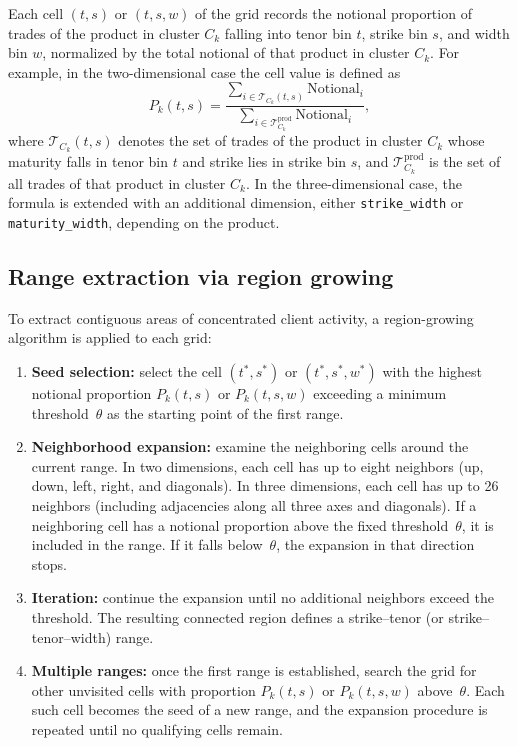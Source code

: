 \documentclass[12pt,a4paper]{report}
\begin{document}
Each cell \((t, s)\) or \((t, s, w)\) of the grid records the notional proportion of trades of the 
product in cluster \(C_k\) falling into tenor bin \(t\), strike bin \(s\), and width bin \(w\), 
normalized by the total notional of that product in cluster \(C_k\). For example, in the 
two-dimensional case the cell value is defined as
\[
    P_{k}(t,s) = 
    \frac{\sum_{i \in \mathcal{T}_{C_k}(t,s)} \text{Notional}_{i}}
         {\sum_{i \in \mathcal{T}_{C_k}^{\text{prod}}} \text{Notional}_{i}},
\]
where \(\mathcal{T}_{C_k}(t,s)\) denotes the set of trades of the product in cluster \(C_k\) whose 
maturity falls in tenor bin \(t\) and strike lies in strike bin \(s\), and 
\(\mathcal{T}_{C_k}^{\text{prod}}\) is the set of all trades of that product in cluster \(C_k\). 
In the three-dimensional case, the formula is extended with an additional dimension, either 
\texttt{strike\_width} or \texttt{maturity\_width}, depending on the product.

\subsection{Range extraction via region growing}\label{subsec:range_extraction}

To extract contiguous areas of concentrated client activity, a region-growing algorithm is applied 
to each grid:

\begin{enumerate}
    \item \textbf{Seed selection:} select the cell \((t^\ast, s^\ast)\) or \((t^\ast, s^\ast, w^\ast)\) with the highest notional proportion \(P_{k}(t,s)\) or \(P_{k}(t,s,w)\) exceeding a minimum threshold~$\theta$ as the starting point of the first range.  
\item \textbf{Neighborhood expansion:} 
examine the neighboring cells around the current range. In two dimensions, each cell has up to 
eight neighbors (up, down, left, right, and diagonals). In three dimensions, each cell has up to 
26 neighbors (including adjacencies along all three axes and diagonals). If a neighboring cell 
has a notional proportion above the fixed threshold~$\theta$, it is included in the range. 
If it falls below~$\theta$, the expansion in that direction stops.  

\item \textbf{Iteration:} 
continue the expansion until no additional neighbors exceed the threshold. The resulting connected 
region defines a strike--tenor (or strike--tenor--width) range.  

\item \textbf{Multiple ranges:} 
once the first range is established, search the grid for other unvisited cells with 
proportion \(P_{k}(t,s)\) or \(P_{k}(t,s,w)\) above~$\theta$. Each such cell becomes the seed of a new range, 
and the expansion procedure is repeated until no qualifying cells remain.  

\end{enumerate}
\end{document}
